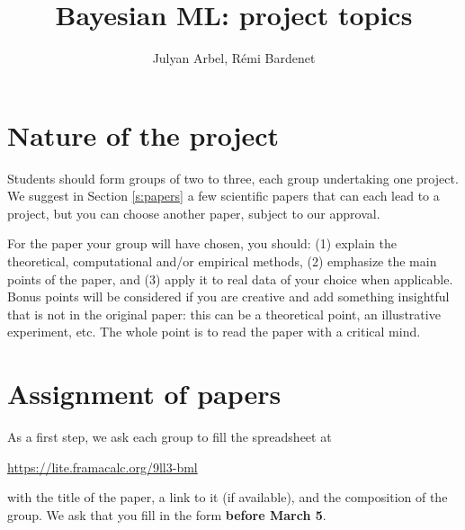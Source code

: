 \documentclass[12pt]{article}%
\begin{document}
\title{Bayesian ML: project topics}
\author{Julyan Arbel, R\'emi Bardenet}
\maketitle

\section{Nature of the project}
Students should form groups of two to three, each group undertaking one project. We suggest in Section \ref{s:papers} a few scientific papers that can each lead to a project, but you can choose another paper, subject to our approval.

For the paper your group will have chosen, you should: (1) explain the theoretical, computational and/or empirical methods, (2) emphasize the main points of the paper, and (3) apply it to real data of your choice when applicable. Bonus points will be considered if you are creative and add something insightful that is not in the original paper: this can be a theoretical point, an illustrative experiment, etc. The whole point is to read the paper with a critical mind.

\section{Assignment of papers}
As a first step, we ask each group to fill the spreadsheet at
\begin{center}
   \href{https://lite.framacalc.org/9ll3-bml}{https://lite.framacalc.org/9ll3-bml}
 \end{center}
with the title of the paper, a link to it (if available), and the composition of the group.
We ask that you fill in the form {\bf before March 5}. %
\end{document}

